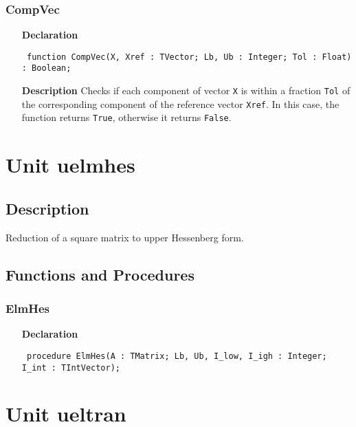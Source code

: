 \documentclass[12pt,a4paper,oneside]{report}
\newcommand{\declarationitem}[1]{\textbf{#1}}
\newcommand{\descriptiontitle}[1]{\textbf{#1}}
\newcommand{\code}[1]{\texttt{#1}}
\begin{document}
\subsubsection{CompVec}
\label{ucompvec-CompVec}
\begin{itemize}\item[\declarationitem{Declaration}\hfill]
	\begin{flushleft}
		\code{
			function CompVec(X, Xref : TVector; Lb, Ub : Integer; Tol : Float) : Boolean;}
		
	\end{flushleft}
	
	\par
	\item[\descriptiontitle{Description}]
	Checks if each component of vector \code{X} is within a fraction \code{Tol} of the corresponding component of the reference vector \code{Xref}. In this case, the function returns \code{True}, otherwise it returns \code{False}.
	
\end{itemize}



\section{Unit uelmhes}
\label{uelmhes}
\subsection{Description}
Reduction of a square matrix to upper Hessenberg form. 
\subsection{Functions and Procedures}
\subsubsection{ElmHes}
\label{uelmhes-ElmHes}
\begin{itemize}\item[\declarationitem{Declaration}\hfill]
	\begin{flushleft}
		\code{
			procedure ElmHes(A : TMatrix; Lb, Ub, I{\_}low, I{\_}igh : Integer; I{\_}int : TIntVector);}
	\end{flushleft}
\end{itemize}
\section{Unit ueltran}
\label{ueltran}
\end{document}
